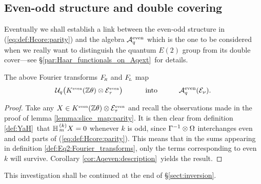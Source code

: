 \subsection{Even-odd structure and double covering}
\label{par:double_covering}


Eventually we shall establish a link between the even-odd structure in
(\ref{eq:def:Hcore:parity}) and the algebra ${\mathcal A}_q^{\rm even}$ which is the one to be
considered when we really want to distinguish the quantum $E(2)$ group from its
double cover---see \S \ref{par:Haar_functionals_on_Aqext}\ for details.


\begin{lemma} \label{prop:double_covering}
The above Fourier transforms\/ $F_{\!\scriptscriptstyle R}$ and\/ $F_{\!\scriptscriptstyle L}$ map
$$\Uq \! \left(\KZeven \tens \Hcore_\tau^\scripteven \vertM\right)
        \hspace{3em} \mbox{into}  \hspace{3em}
  \Aqeven(\Hcore_\nu). $$
\end{lemma}
\begin{proof}
Take any $X \in K^{\rm \scriptscriptstyle even}(\mathbb{Z} \theta) \otimes \mathcal E_\tau^{\rm \scriptscriptstyle even}$ and recall the
observations made in the proof of lemma \ref{lemma:slice_map:parity}\@. It is
then clear from definition \ref{def:YaH}\ that $\mathbb{H}_{\,m}^{\,(k)} X = 0$ whenever $k$
is odd, since $\Gamma^{-1} \otimes \Omega$ interchanges even and odd parts of
(\ref{eq:def:Hcore:parity}). This means that in the sums appearing in
definition \ref{def:Eq2:Fourier_transforms}, only the terms corresponding to
even $k$ will survive. Corollary \ref{cor:Aqeven:description}\ yields the
result.
\end{proof}
\vspace{2ex}

This investigation shall be continued at the end of \S \ref{sect:inversion}\@.
